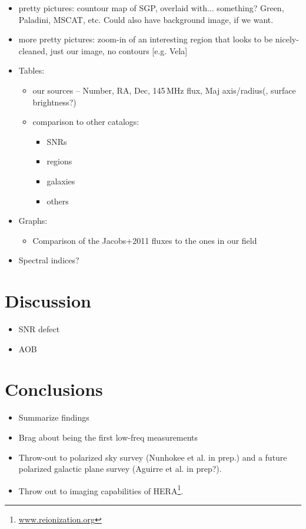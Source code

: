 \documentclass[preprint2,epsf,epsfig,graphics]{emulateapj}
\begin{document}
\begin{itemize}
\item pretty pictures: countour map of SGP, overlaid with... something? Green, Paladini, MSCAT, etc. Could also have background image, if we want.
\item more pretty pictures: zoom-in of an interesting region that looks to be nicely-cleaned, just our image, no contours [e.g. Vela]
\item Tables: 
	\begin{itemize}
	\item our sources -- Number, RA, Dec, 145\,MHz flux, Maj axis/radius(, surface brightness?)
	\item comparison to other catalogs:
		\begin{itemize}
		\item SNRs
		\item {} regions
		\item galaxies
		\item others
		\end{itemize}
	\end{itemize}	
\item Graphs:
	\begin{itemize}
	\item Comparison of the Jacobs+2011 fluxes to the ones in our field
	\end{itemize}
\item Spectral indices?
\end{itemize}


\section{Discussion}
\label{sec:disc}

\begin{itemize}
\item SNR defect
\item AOB
\end{itemize}

\section{Conclusions}
\label{sec:conc}

\begin{itemize}
\item Summarize findings
\item Brag about being the first low-freq measurements
\item Throw-out to polarized sky survey (Nunhokee et al. in prep.) and a future polarized galactic plane survey (Aguirre et al. in prep?).
\item Throw out to imaging capabilities of HERA\footnote{\url{www.reionization.org}}.
\end{itemize}
\end{document}
